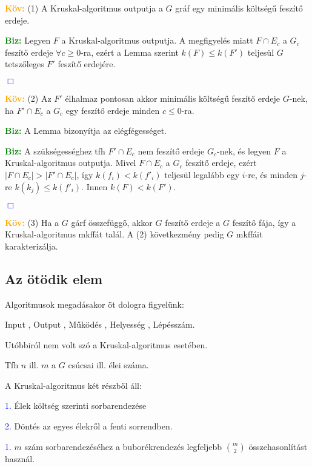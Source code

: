 \documentclass[12pt]{article}
\begin{document}
			\textcolor{orange}{\textbf{Köv:}} (1) A Kruskal-algoritmus outputja a $G$ gráf egy minimális költségű feszítő erdeje. 
			
			\textcolor{green}{\textbf{Biz:}} Legyen $F$ a Kruskal-algoritmus outputja. A megfigyelés miatt $F \cap E_c$ a $G_c$ feszítő erdeje $\forall c \geq 0$-ra, ezért a Lemma szerint $k(F) \leq k(F')$ teljesül $G$ tetszőleges $F'$ feszítő erdejére. \raggedright \textcolor{blue}{$\Box$} 

			\textcolor{orange}{\textbf{Köv:}} (2) Az $F'$ élhalmaz pontosan akkor minimális költségű feszítő erdeje $G$-nek, ha $F' \cap E_c$ a $G_c$ egy feszítő erdeje minden $c \leq 0$-ra.

			\textcolor{green}{\textbf{Biz:}} A Lemma bizonyítja az elégfégességet.

			\textcolor{green}{\textbf{Biz:}} A szükségességhez tfh $F' \cap E_c$ nem feszítő erdeje $G_c$-nek, és legyen $F$ a Kruskal-algoritmus outputja. Mivel $F \cap E_c$ a $G_c$ feszítő erdeje, ezért $|F \cap E_c| > |F' \cap E_c|$, így $k(f_i) < k(f'_i)$ teljesül legalább egy $i$-re, és minden $j$-re $k(k_j) \leq k(f'_i)$. Innen $k(F) < k(F')$. \raggedright \textcolor{blue}{$\Box$}

			\textcolor{orange}{\textbf{Köv:}} (3) Ha a $G$ gárf összefüggő, akkor $G$ feszítő erdeje a $G$ feszítő fája, így a Kruskal-algoritmus mkffát talál. A (2) következmény pedig $G$ mkffáit karakterizálja.
		
		\subsection{Az ötödik elem}
		
			Algoritmusok megadásakor öt dologra figyelünk:

			Input \checkmark, Output \checkmark, Működés \checkmark, Helyesség \checkmark, Lépésszám. 

			Utóbbiról nem volt szó a Kruskal-algoritmus esetében. 

			Tfh $n$ ill. $m$ a $G$ csúcsai ill. élei száma. 

			A Kruskal-algoritmus két részből áll: 

			\;\;\;\;\;\textcolor{blue}{1.} Élek költség szerinti sorbarendezése 

			\;\;\;\;\;\textcolor{blue}{2.} Döntés az egyes élekről a fenti sorrendben. 
			
			\textcolor{blue}{1.} $m$ szám sorbarendezéséhez a buborékrendezés legfeljebb $\binom{m}{2}$ összehasonlítást használ.
			
\end{document}
